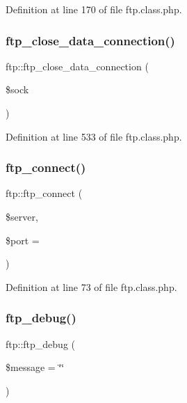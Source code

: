 Definition at line 170 of file ftp.\+class.\+php.

\mbox{\label{classftp_ae476d651d3ec9ea3b00f19371d9fcece}} 
\subsubsection{\texorpdfstring{ftp\+\_\+close\+\_\+data\+\_\+connection()}{ftp\_close\_data\_connection()}}
{\footnotesize\ttfamily ftp\+::ftp\+\_\+close\+\_\+data\+\_\+connection (\begin{DoxyParamCaption}\item[{}]{\$sock }\end{DoxyParamCaption})}



Definition at line 533 of file ftp.\+class.\+php.

\mbox{\label{classftp_aadbf8f460f13c6ced454e50d91ed77c3}} 
\subsubsection{\texorpdfstring{ftp\+\_\+connect()}{ftp\_connect()}}
{\footnotesize\ttfamily ftp\+::ftp\+\_\+connect (\begin{DoxyParamCaption}\item[{}]{\$server,  }\item[{}]{\$port = {} }\end{DoxyParamCaption})}



Definition at line 73 of file ftp.\+class.\+php.

\mbox{\label{classftp_adb6a01340ad0c2f579fae61b8777aaad}} 
\subsubsection{\texorpdfstring{ftp\+\_\+debug()}{ftp\_debug()}}
{\footnotesize\ttfamily ftp\+::ftp\+\_\+debug (\begin{DoxyParamCaption}\item[{}]{\$message = {\ttfamily \char`\"{}\char`\"{}} }\end{DoxyParamCaption})}



